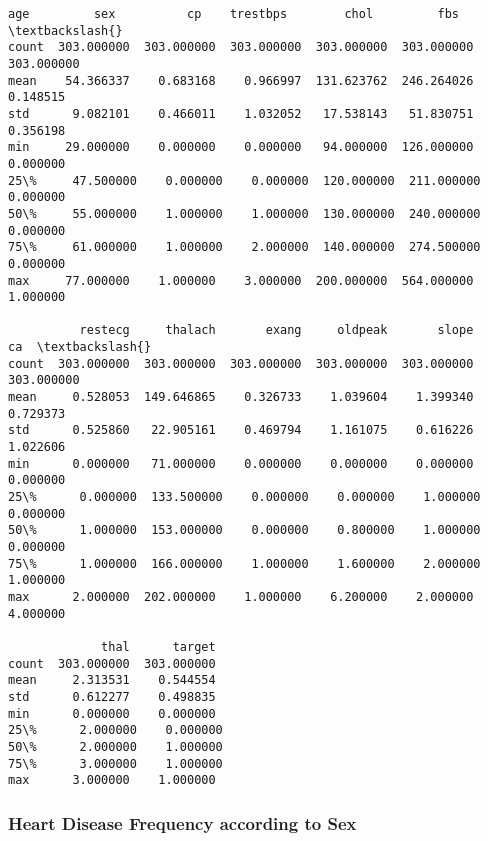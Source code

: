 \documentclass[11pt]{article}
\makeatletter
\newcommand{\boxspacing}{\kern\kvtcb@left@rule\kern\kvtcb@boxsep}
\newcommand{\prompt}[4]{
        \ttfamily\llap{{\color{#2}[#3]:\hspace{3pt}#4}}\vspace{-\baselineskip}
    }
\makeatother
\begin{document}
            \begin{tcolorbox}[breakable, size=fbox, boxrule=.5pt, pad at break*=1mm, opacityfill=0]
\prompt{Out}{outcolor}{11}{\boxspacing}
\begin{Verbatim}[commandchars=\\\{\}]
              age         sex          cp    trestbps        chol         fbs  \textbackslash{}
count  303.000000  303.000000  303.000000  303.000000  303.000000  303.000000
mean    54.366337    0.683168    0.966997  131.623762  246.264026    0.148515
std      9.082101    0.466011    1.032052   17.538143   51.830751    0.356198
min     29.000000    0.000000    0.000000   94.000000  126.000000    0.000000
25\%     47.500000    0.000000    0.000000  120.000000  211.000000    0.000000
50\%     55.000000    1.000000    1.000000  130.000000  240.000000    0.000000
75\%     61.000000    1.000000    2.000000  140.000000  274.500000    0.000000
max     77.000000    1.000000    3.000000  200.000000  564.000000    1.000000

          restecg     thalach       exang     oldpeak       slope          ca  \textbackslash{}
count  303.000000  303.000000  303.000000  303.000000  303.000000  303.000000
mean     0.528053  149.646865    0.326733    1.039604    1.399340    0.729373
std      0.525860   22.905161    0.469794    1.161075    0.616226    1.022606
min      0.000000   71.000000    0.000000    0.000000    0.000000    0.000000
25\%      0.000000  133.500000    0.000000    0.000000    1.000000    0.000000
50\%      1.000000  153.000000    0.000000    0.800000    1.000000    0.000000
75\%      1.000000  166.000000    1.000000    1.600000    2.000000    1.000000
max      2.000000  202.000000    1.000000    6.200000    2.000000    4.000000

             thal      target
count  303.000000  303.000000
mean     2.313531    0.544554
std      0.612277    0.498835
min      0.000000    0.000000
25\%      2.000000    0.000000
50\%      2.000000    1.000000
75\%      3.000000    1.000000
max      3.000000    1.000000
\end{Verbatim}
\end{tcolorbox}
        
    \hypertarget{heart-disease-frequency-according-to-sex}{%
\subsubsection{Heart Disease Frequency according to
Sex}\label{heart-disease-frequency-according-to-sex}}
\end{document}
